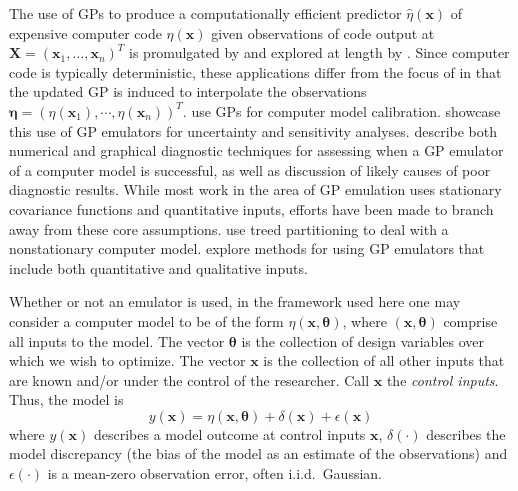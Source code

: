 \documentclass[12pt]{article}
\begin{document}
The use of GPs to produce a computationally efficient predictor $\hat \eta (\mathbf x)$ of expensive computer code $\eta(\mathbf x)$ given observations of code output at $\mathbf X=(\mathbf x_1,\ldots,\mathbf x_n)^T$ is promulgated by \cite{Sacks1989} and explored at length by \cite{Santner2003a}.
%
Since computer code is typically deterministic, these applications differ from the focus of \cite{OHagan1978} in that the updated GP is induced to interpolate the observations $\boldsymbol \eta = (\eta(\mathbf x_1),\cdots,\eta(\mathbf x_n))^T$. 
%
\cite{Kennedy2001} use GPs for computer model calibration. 
%
\cite{Kennedy2006} showcase this use of GP emulators for uncertainty and sensitivity analyses. 
%
\cite{Bastos2009} describe both numerical and graphical diagnostic techniques for assessing when a GP emulator of a computer model is successful, as well as discussion of likely causes of poor diagnostic results. 
%
While most work in the area of GP emulation uses stationary covariance functions 
and quantitative inputs, efforts have been made to branch away from these core assumptions. 
%
\cite{Gramacy2008} use treed partitioning to deal with a nonstationary computer model. 
%
\cite{Qian2008} explore methods for using GP emulators that include both quantitative and qualitative inputs.
%

Whether or not an emulator is used, in the framework used here one may consider a computer model to be of the form $\eta(\mathbf x,\boldsymbol \theta)$, where $(\mathbf x,\boldsymbol \theta)$ comprise all inputs to the model. 
%
The vector $\boldsymbol \theta$ is the collection of design variables over which we wish to optimize. 
%
The vector $\mathbf x$ is the collection of all other inputs that are known and/or under the control of the researcher.
%
Call $\mathbf x$ the \emph{control inputs}.
%
Thus, the model is
%
\begin{equation} \label{eq:model_gen}
y(\mathbf x)=\eta(\mathbf x,\boldsymbol \theta) + \delta(\mathbf x)+\epsilon(\mathbf x)
\end{equation} 
%
where $y(\mathbf x)$ describes a model outcome at control inputs $\mathbf x$, $\delta(\cdot)$ describes the model discrepancy (the bias of the model as an estimate of the observations) and $\epsilon(\cdot)$ is a mean-zero observation error, often i.i.d.\ Gaussian. 
%
\end{document}
